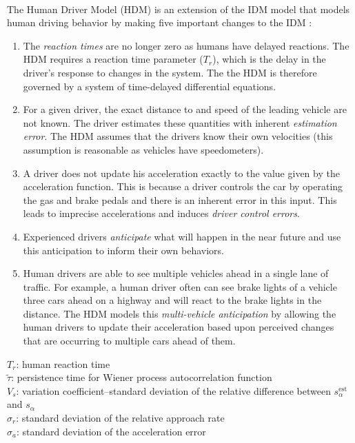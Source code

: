 \documentclass[12pt]{article}
\begin{document}
\paragraph{}
The Human Driver Model (HDM) is an extension of the IDM model that models human driving behavior by making five important changes to the IDM \cite[chapter~12]{treiber_kesting_2013}:
\begin{enumerate}
  \item The\textit{ reaction times} are no longer zero as humans have delayed reactions.  The HDM requires a reaction time parameter ($T_r$), which is the delay in the driver's response to changes in the system.  The the HDM is therefore governed by a system of time-delayed differential equations.
  \item For a given driver, the exact distance to and speed of the leading vehicle are not known.  The driver estimates these quantities with inherent \textit{estimation error}.  The HDM assumes that the drivers know their own velocities (this assumption is reasonable as vehicles have speedometers).
  \item A driver does not update his acceleration exactly to the value given by the acceleration function.  This is because a driver controls the car by operating the gas and brake pedals and there is an inherent error in this input. This leads to imprecise accelerations and induces \textit{driver control errors}.
  \item Experienced drivers \textit{anticipate} what will happen in the near future and use this anticipation to inform their own behaviors.
  \item Human drivers are able to see multiple vehicles ahead in a single lane of traffic.  For example, a human driver often can see brake lights of a vehicle three cars ahead on a highway and will react to the brake lights in the distance. The HDM models this \textit{multi-vehicle anticipation} by allowing the human drivers to update their acceleration based upon perceived changes that are occurring to multiple cars ahead of them.
\end{enumerate}
\begin{mymathbox}[title=HDM Parameters,colframe=blue!30!black]
  $T_r$: human reaction time\\
  $\tilde{\tau}$: persistence time for Wiener process autocorrelation function\\
  $V_s$: variation coefficient\---standard deviation of the relative difference between $s_\alpha^\text{est}$ and $s_\alpha$\\
  $\sigma_r$: standard deviation of the relative approach rate\\
  $\sigma_a$: standard deviation of the acceleration error
\end{mymathbox}
\end{document}
